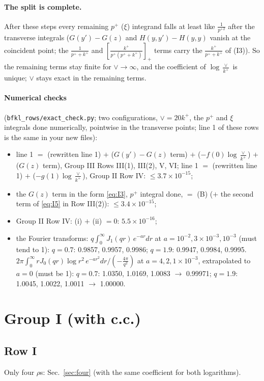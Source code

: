 \documentclass[10pt]{article}
\numberwithin{equation}{section}
\begin{document}
\paragraph{The split is complete.} After these steps every remaining $p^+$ ($\xi$) integrand falls at least like $\frac{1}{p^{+2}}$ after the transverse integrals ($G(y')-G(z)$ and $H(y,y')-H(y,y)$ vanish at the coincident point; the $\frac{1}{p^++k^+}$ and $\left[\frac{k^+}{p^+(p^++k^+)}\right]_+$ terms carry the $\frac{k^+}{p^++k^+}$ of (I3)). So the remaining terms stay finite for $\vee\to\infty$, and the coefficient of $\log\frac{\vee}{k^+}$ is unique; $\vee$ stays exact in the remaining terms.

\paragraph{Numerical checks} (\texttt{bfkl\_rows/exact\_check.py}; two configurations, $\vee=20k^+$, the $p^+$ and $\xi$ integrals done numerically, pointwise in the transverse points; line 1 of these rows is the same in your new files):
\begin{itemize}
\item line 1 $=$ (rewritten line 1) $+$ ($G(y')-G(z)$ term) $+$ ($-f(0)\log\frac{\vee}{k^+}$) $+$ ($G(z)$ term), Group III Rows III(1), III(2), V, VI; line 1 $=$ (rewritten line 1) $+$ ($-g(1)\log\frac{\vee}{k^+}$), Group II Row IV: $\le3.7\times10^{-15}$;
\item the $G(z)$ term in the form \eqref{eq:I3}, $p^+$ integral done, $=$ (B) ($+$ the second term of \eqref{eq:I5} in Row III(2)): $\le3.4\times10^{-15}$;
\item Group II Row IV: (i) $+$ (ii) $=0$: $5.5\times10^{-16}$;
\item the Fourier transforms: $q\int_0^\infty J_1(qr)\,e^{-ar}dr$ at $a=10^{-2},3\times10^{-3},10^{-3}$ (must tend to 1): $q=0.7$: 0.9857, 0.9957, 0.9986; $q=1.9$: 0.9947, 0.9984, 0.9995. $2\pi\int_0^\infty rJ_0(qr)\log r^2\,e^{-ar^2}dr\big/(-\frac{4\pi}{q^2})$ at $a=4,2,1\times10^{-3}$, extrapolated to $a=0$ (must be 1): $q=0.7$: 1.0350, 1.0169, 1.0083 $\to$ 0.99971; $q=1.9$: 1.0045, 1.0022, 1.0011 $\to$ 1.00000.
\end{itemize}

\section{Group I (with c.c.)}\label{sec:LLgI}
\subsection{Row I}
Only four $\rho$\textquotesingle s: Sec.~\ref{sec:four} (with the same coefficient for both logarithms).
\end{document}
